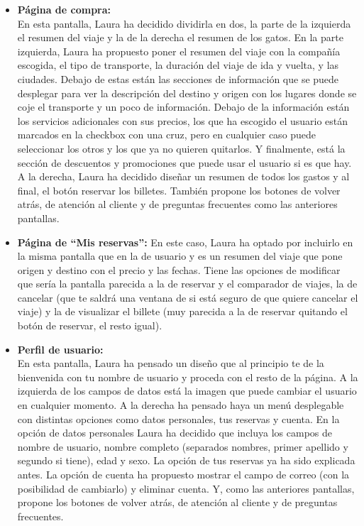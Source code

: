 \begin{itemize}
    \item\textbf{Página de compra:} \\ En esta pantalla, Laura ha decidido dividirla en dos, la parte de la izquierda el resumen del viaje y la de la derecha el resumen de los gatos.
    En la parte izquierda, Laura ha propuesto poner el resumen del viaje con la compañía escogida, el tipo de transporte, la duración del viaje de ida y vuelta, y las ciudades. Debajo de estas están las secciones de información que se puede desplegar para ver la descripción del destino y origen con los lugares donde se coje el transporte y un poco de información. Debajo de la información están los servicios adicionales con sus precios, los que ha escogido el usuario están marcados en la checkbox con una cruz, pero en cualquier caso puede seleccionar los otros y los que ya no quieren quitarlos. Y finalmente, está la sección de descuentos y promociones que puede usar el usuario si es que hay.
    A la derecha, Laura ha decidido diseñar un resumen de todos los gastos y al final, el botón reservar los billetes.
    También propone los botones de volver atrás, de atención al cliente y de preguntas frecuentes como las anteriores pantallas.
    \item\textbf{Página de ``Mis reservas'':} En este caso, Laura ha optado por incluirlo en la misma pantalla que en la de usuario y es un resumen del viaje que pone origen y destino con el precio y las fechas. Tiene las opciones de modificar que sería la pantalla parecida a la de reservar y el comparador de viajes, la de cancelar (que te saldrá una ventana de si está seguro de que quiere cancelar el viaje) y la de visualizar el billete (muy parecida a la de reservar quitando el botón de reservar, el resto igual).
    \item\textbf{Perfil de usuario:} \\ En esta pantalla, Laura ha pensado un diseño que al principio te de la bienvenida con tu nombre de usuario y proceda con el resto de la página.
    A la izquierda de los campos de datos está la imagen que puede cambiar el usuario en cualquier momento.
    A la derecha ha pensado haya un menú desplegable con distintas opciones como datos personales, tus reservas y cuenta. 
    En la opción de datos personales Laura ha decidido que incluya los campos de nombre de usuario, nombre completo (separados nombres, primer apellido y segundo si tiene), edad y sexo.
    La opción de tus reservas ya ha sido explicada antes.
    La opción de cuenta ha propuesto mostrar el campo de correo (con la posibilidad de cambiarlo) y eliminar cuenta.
    Y, como las anteriores pantallas, propone los botones de volver atrás, de atención al cliente y de preguntas frecuentes.
    
\end{itemize}

